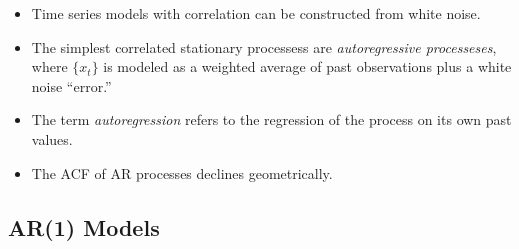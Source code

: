 \documentclass[11pt]{article}
\begin{document}
\begin{itemize}
    \item Time series models with correlation can be constructed from white noise.
    \item The simplest correlated stationary processess are \textit{autoregressive processeses},
    where $\{x_t\}$ is modeled as a weighted average of past observations plus a white noise 
    ``error.''
    \item The term \textit{autoregression} refers to the regression of the process on its own 
    past values. 
    \item The ACF of AR processes declines geometrically.
\end{itemize}

\subsection{AR(1) Models}
\end{document}
